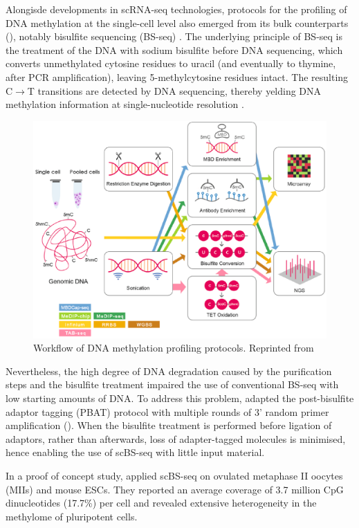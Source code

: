 Alongisde developments in scRNA-seq technologies, protocols for the profiling of DNA methylation at the single-cell level also emerged from its bulk counterparts (), notably bisulfite sequencing (BS-seq) \cite{Smallwood2014,Guo2013,Gravina2016,Farlik2015}. The underlying principle of BS-seq is the treatment of the DNA with sodium bisulfite before DNA sequencing, which converts unmethylated cytosine residues to uracil (and eventually to thymine, after PCR amplification), leaving 5-methylcytosine residues intact. The resulting C$\to$T transitions are detected by DNA sequencing, thereby yelding DNA methylation information at single-nucleotide resolution \cite{Frommer1992,Clark2016,Clark2017}.

\begin{figure}[H]
	\centering
	\includegraphics[width=0.8\linewidth]{methylation_protocols}
	\caption[]{Workflow of DNA methylation profiling protocols. Reprinted from \cite{Yong2016}}
	\label{fig:methylation_protocols}
\end{figure}

Nevertheless, the high degree of DNA degradation caused by the purification steps and the bisulfite treatment impaired the use of conventional BS-seq with low starting amounts of DNA. To address this problem, \cite{Smallwood2014} adapted the post-bisulfite adaptor tagging (PBAT) protocol with multiple rounds of 3' random primer amplification (). When the bisulfite treatment is performed before ligation of adaptors, rather than afterwards, loss of adapter-tagged molecules is minimised, hence enabling the use of scBS-seq with little input material.

In a proof of concept study, \cite{Smallwood2014} applied scBS-seq on ovulated metaphase II oocytes (MIIs) and mouse ESCs. They reported an average coverage of 3.7 million CpG dinucleotides (17.7\%) per cell and revealed extensive heterogeneity in the methylome of pluripotent cells.

